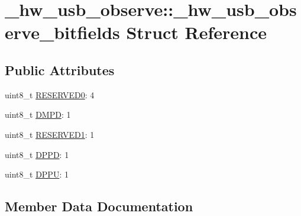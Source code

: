 \hypertarget{struct__hw__usb__observe_1_1__hw__usb__observe__bitfields}{}\section{\+\_\+hw\+\_\+usb\+\_\+observe\+:\+:\+\_\+hw\+\_\+usb\+\_\+observe\+\_\+bitfields Struct Reference}
\label{struct__hw__usb__observe_1_1__hw__usb__observe__bitfields}
\subsection*{Public Attributes}
\begin{DoxyCompactItemize}
\item 
uint8\+\_\+t \hyperlink{struct__hw__usb__observe_1_1__hw__usb__observe__bitfields_abbec1232da1b1dbbb0c1382f87d8e646}{R\+E\+S\+E\+R\+V\+E\+D0}\+: 4
\item 
uint8\+\_\+t \hyperlink{struct__hw__usb__observe_1_1__hw__usb__observe__bitfields_a09d5d23e3f79d888b1a1b98588835250}{D\+M\+PD}\+: 1
\item 
uint8\+\_\+t \hyperlink{struct__hw__usb__observe_1_1__hw__usb__observe__bitfields_a5828c43245d449a0a4bc5fde4a4d3cbb}{R\+E\+S\+E\+R\+V\+E\+D1}\+: 1
\item 
uint8\+\_\+t \hyperlink{struct__hw__usb__observe_1_1__hw__usb__observe__bitfields_aa765774f5426ad2fa0687847d8e5f641}{D\+P\+PD}\+: 1
\item 
uint8\+\_\+t \hyperlink{struct__hw__usb__observe_1_1__hw__usb__observe__bitfields_a77ef5ab8218a79d24aed65170059a907}{D\+P\+PU}\+: 1
\end{DoxyCompactItemize}


\subsection{Member Data Documentation}
